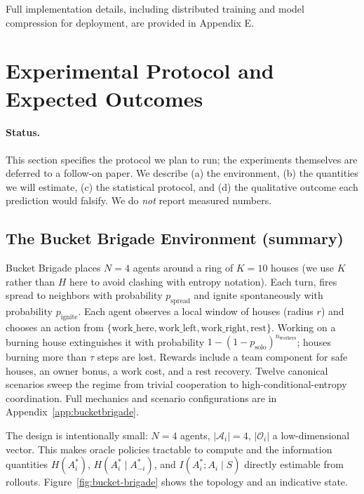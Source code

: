 \documentclass[10pt, letterpaper]{article}
\begin{document}
Full implementation details, including distributed training and model compression for deployment, are provided in Appendix E.

\section{Experimental Protocol and Expected Outcomes}
\label{sec:experiments}

\paragraph{Status.} This section specifies the protocol we plan to run; the experiments themselves are deferred to a follow-on paper. We describe (a) the environment, (b) the quantities we will estimate, (c) the statistical protocol, and (d) the qualitative outcome each prediction would falsify. We do \emph{not} report measured numbers.

\subsection{The Bucket Brigade Environment (summary)}

Bucket Brigade places $N{=}4$ agents around a ring of $K{=}10$ houses (we use $K$ rather than $H$ here to avoid clashing with entropy notation). Each turn, fires spread to neighbors with probability $p_\text{spread}$ and ignite spontaneously with probability $p_\text{ignite}$. Each agent observes a local window of houses (radius $r$) and chooses an action from $\{\text{work\_here}, \text{work\_left}, \text{work\_right}, \text{rest}\}$. Working on a burning house extinguishes it with probability $1 - (1-p_\text{solo})^{n_\text{workers}}$; houses burning more than $\tau$ steps are lost. Rewards include a team component for safe houses, an owner bonus, a work cost, and a rest recovery. Twelve canonical scenarios sweep the regime from trivial cooperation to high-conditional-entropy coordination. Full mechanics and scenario configurations are in Appendix~\ref{app:bucketbrigade}.

The design is intentionally small: $N{=}4$ agents, $|\mathcal{A}_i|{=}4$, $|\mathcal{O}_i|$ a low-dimensional vector. This makes oracle policies tractable to compute and the information quantities $H(A_i^*)$, $H(A_i^* \mid A_{-i}^*)$, and $I(A_i^*; A_i \mid S)$ directly estimable from rollouts. Figure~\ref{fig:bucket-brigade} shows the topology and an indicative state.
\end{document}
